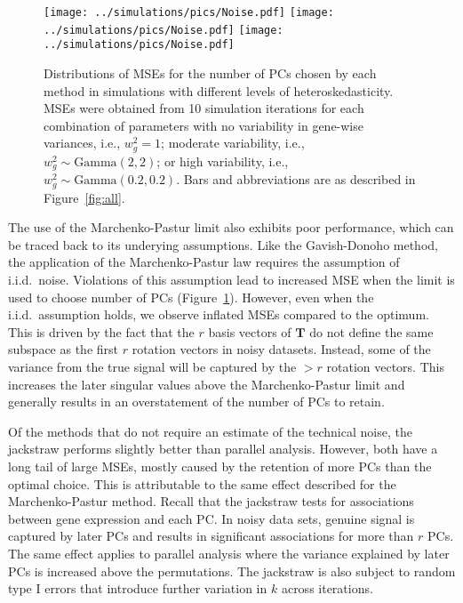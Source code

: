 \documentclass[10pt,letterpaper]{article}
\begin{document}
\begin{figure}
\begin{center}
    \texttt{[image: ../simulations/pics/Noise.pdf]}
    \texttt{[image: ../simulations/pics/Noise.pdf]}
    \texttt{[image: ../simulations/pics/Noise.pdf]}
\end{center}
\caption{Distributions of MSEs for the number of PCs chosen by each method in simulations with different levels of heteroskedasticity.
MSEs were obtained from 10 simulation iterations for each combination of parameters with 
no variability in gene-wise variances, i.e., $w_g^2=1$;
moderate variability, i.e., $w_g^2 \sim \mbox{Gamma}(2, 2)$;
or high variability, i.e., $w_g^2 \sim \mbox{Gamma}(0.2, 0.2)$.
Bars and abbreviations are as described in Figure~\ref{fig:all}.    
}
\label{fig:noise}
\end{figure}

The use of the Marchenko-Pastur limit also exhibits poor performance, which can be traced back to its underying assumptions.
Like the Gavish-Donoho method, the application of the Marchenko-Pastur law requires the assumption of i.i.d.\ noise.
Violations of this assumption lead to increased MSE when the limit is used to choose number of PCs (Figure~\ref{fig:noise}).
However, even when the i.i.d.\ assumption holds, we observe inflated MSEs compared to the optimum.
This is driven by the fact that the $r$ basis vectors of $\mathbf{T}$ do not define the same subspace as the first $r$ rotation vectors in noisy datasets.
Instead, some of the variance from the true signal will be captured by the $>r$ rotation vectors.
This increases the later singular values above the Marchenko-Pastur limit and generally results in an overstatement of the number of PCs to retain. 

Of the methods that do not require an estimate of the technical noise, the jackstraw performs slightly better than parallel analysis.
However, both have a long tail of large MSEs, mostly caused by the retention of more PCs than the optimal choice.
This is attributable to the same effect described for the Marchenko-Pastur method.
Recall that the jackstraw tests for associations between gene expression and each PC.
In noisy data sets, genuine signal is captured by later PCs and results in significant associations for more than $r$ PCs.
The same effect applies to parallel analysis where the variance explained by later PCs is increased above the permutations.
The jackstraw is also subject to random type I errors that introduce further variation in $k$ across iterations.
\end{document}
